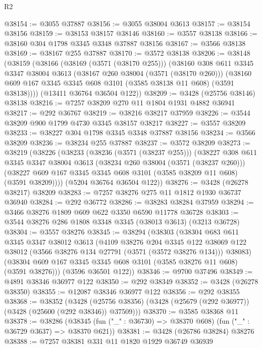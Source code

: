 \begin{lexlean}{R2}
\begin{coremodule}
@38154 := @3055 @37887
@38156 := @3055 @38004 @3613
@38157 := @38154 @38156
@38159 := @38153 @38157 @38146
@38160 := @3557 @38138
@38166 := @38160 @304 @1798 @3345 @3348 @37887 @38156
@38167 := @3566 @38138
@38169 := @38167 @255 @37887
@38170 := @3572 @38138
@38206 := @38148
    (@38159
      (@38166
        (@38169 (@3571 (@38170 @255)))
        (@38160
          @308
          @611
          @3345
          @3347
          @38004
          @3613
          (@38167 @260 @38004 (@3571 (@38170 @260)))
          (@38160 @609 @167 @3345 @3345 @608 @3101 (@3585 @38138 @11 @608) (@3591 @38138))))
      (@13411 @36764 @36504 @122))
@38209 := @3428 (@25756 @38146) @38138
@38216 := @7257 @38209 @270 @11 @1804 @1931 @4882 @36941
@38217 := @292 @36767
@38219 := @38216 @38217 @37959
@38226 := @3544 @38209 @900 @1799 @4730 @3345 @38157 @38217
@38227 := @3557 @38209
@38233 := @38227 @304 @1798 @3345 @3348 @37887 @38156
@38234 := @3566 @38209
@38236 := @38234 @255 @37887
@38237 := @3572 @38209
@38273 := @38219
    (@38226
      (@38233
        (@38236 (@3571 (@38237 @255)))
        (@38227
          @308
          @611
          @3345
          @3347
          @38004
          @3613
          (@38234 @260 @38004 (@3571 (@38237 @260)))
          (@38227 @609 @167 @3345 @3345 @608 @3101 (@3585 @38209 @11 @608) (@3591 @38209))))
      (@5204 @36764 @36504 @122))
@38276 := @3428 (@26278 @38217) @38209
@38283 := @7257 @38276 @275 @11 @1812 @1930 @36737 @36940
@38284 := @292 @36772
@38286 := @38283 @38284 @37959
@38294 := @3466 @38276 @1809 @609 @622 @3350 @6590 @11778 @36728
@38303 := @3544 @38276 @286 @1808 @3348 @3345 (@38013 @3613) (@3213 @36728)
@38304 := @3557 @38276
@38345 := @38294
    (@38303
      (@38304
        @683
        @611
        @3345
        @3347
        @38012
        @3613
        (@4109
          @38276
          @204
          @3345
          @122
          @38069
          @122
          @38012
          (@3566 @38276 @134 @27791 (@3571 (@3572 @38276 @134)))
          @38083)
        (@38304 @609 @167 @3345 @3345 @608 @3101 (@3585 @38276 @11 @608) (@3591 @38276)))
      (@3596 @36501 @122))
@38346 := @9700 @37496
@38349 := @4891 @38346 @36977 @122
@38350 := @292 @38349
@38352 := @3428 (@26278 @38350)
@38355 := @12087 @38346 @36977 @122
@38356 := @292 @38355
@38368 := @38352
    (@3428 (@25756 @38356) (@3428 (@25679 (@292 @36977)) (@3428 (@25600 (@292 @38346)) @37509)))
@38370 := @3585 @38368 @11
@38378 := @38286
    (@38345 (fun ("_" : @36730) => @38370 @608) (fun ("_" : @36729 @3637) => @38370 @621))
@38381 := @3428 (@26786 @38284) @38276
@38388 := @7257 @38381 @331 @11 @1820 @1929 @36749 @36939

\end{coremodule}
\end{lexlean}
